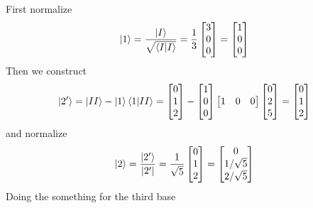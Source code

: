 \documentclass[../main.tex]{subfiles}
\begin{document}
First normalize
\begin{equation*}
	\ket{1}=\frac{\ket{I}}{\sqrt{\braket{I|I}}}=\frac{1}{3}\begin{bmatrix}
		3 \\0\\0
	\end{bmatrix}=\begin{bmatrix}
		1 \\0\\0
	\end{bmatrix}
\end{equation*}
Then we construct
\begin{equation*}
	\ket{2'}=\ket{II}-\ket{1}\braket{1|II}=\begin{bmatrix}
		0 \\1\\2
	\end{bmatrix}
	-
	\begin{bmatrix}
		1 \\0\\0
	\end{bmatrix}
	\begin{bmatrix}
		1 & 0 & 0
	\end{bmatrix}
	\begin{bmatrix}
		0 \\2\\5
	\end{bmatrix}
	=
	\begin{bmatrix}
		0 \\1\\2
	\end{bmatrix}
\end{equation*}
and normalize
\begin{equation*}
    \ket{2}=\frac{\ket{2'}}{|2'|}=\frac{1}{\sqrt{5}}\begin{bmatrix}
        0\\1\\2
    \end{bmatrix}=
    \begin{bmatrix}
        0\\1/\sqrt{5}\\2/\sqrt{5}
    \end{bmatrix}
\end{equation*}
Doing the something for the third base
\end{document}
